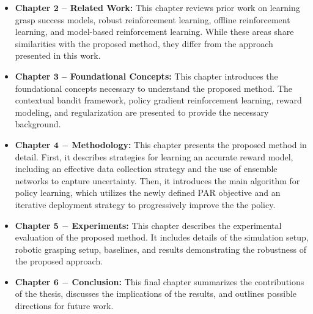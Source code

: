 \documentclass[./dissertation.tex]{subfiles}
\begin{document}
\begin{itemize}

    \item \textbf{Chapter $\mathbf{2}$ -- Related Work:} This chapter reviews prior work on learning grasp success models, robust reinforcement learning, offline reinforcement learning, and model-based reinforcement learning. While these areas share similarities with the proposed method, they differ from the approach presented in this work.

    \item \textbf{Chapter $\mathbf{3}$ -- Foundational Concepts:} This chapter introduces the foundational concepts necessary to understand the proposed method. The contextual bandit framework, policy gradient reinforcement learning, reward modeling, and regularization are presented to provide the necessary background.

    \item \textbf{Chapter $\mathbf{4}$ $\mathbf{-}$ Methodology:} This chapter presents the proposed method in detail. First, it describes strategies for learning an accurate reward model, including an effective data collection strategy and the use of ensemble networks to capture uncertainty. Then, it introduces the main algorithm for policy learning, which utilizes the newly defined PAR objective and an iterative deployment strategy to progressively improve the the policy.

    \item \textbf{Chapter $\mathbf{5}$ $\mathbf{-}$ Experiments:} This chapter describes the experimental evaluation of the proposed method. It includes details of the simulation setup, robotic grasping setup, baselines, and results demonstrating the robustness of the proposed approach.

    \item \textbf{Chapter $\mathbf{6}$ $\mathbf{-}$ Conclusion:} This final chapter summarizes the contributions of the thesis, discusses the implications of the results, and outlines possible directions for future work.

\end{itemize}
\end{document}
